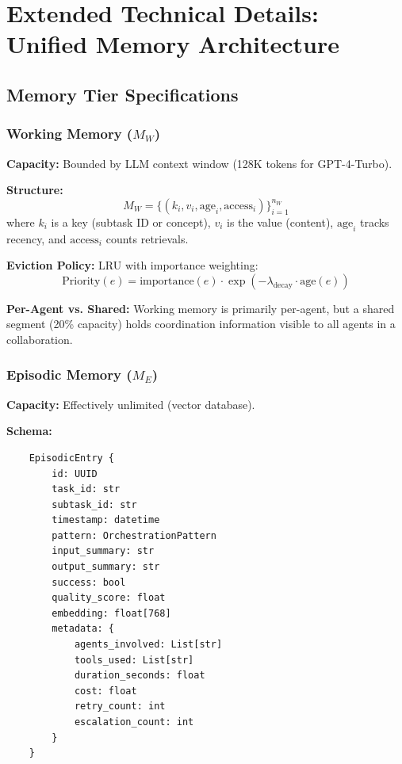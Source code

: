 \documentclass{article}
\theoremstyle{plain}
\theoremstyle{definition}
\theoremstyle{remark}
\begin{document}

\section{Extended Technical Details: Unified Memory Architecture}
\label{sec:uma_extended}

\subsection{Memory Tier Specifications}
\label{sec:uma_tiers}

\subsubsection{Working Memory ($M_W$)}

\textbf{Capacity:} Bounded by LLM context window (128K tokens for GPT-4-Turbo).

\textbf{Structure:}
\begin{equation}
	M_W = \{(k_i, v_i, \text{age}_i, \text{access}_i)\}_{i=1}^{n_W}
\end{equation}
where $k_i$ is a key (subtask ID or concept), $v_i$ is the value (content), $\text{age}_i$ tracks recency, and $\text{access}_i$ counts retrievals.

\textbf{Eviction Policy:} LRU with importance weighting:
\begin{equation}
	\text{Priority}(e) = \text{importance}(e) \cdot \exp(-\lambda_{\text{decay}} \cdot \text{age}(e))
\end{equation}

\textbf{Per-Agent vs. Shared:} Working memory is primarily per-agent, but a shared segment (20\% capacity) holds coordination information visible to all agents in a collaboration.

\subsubsection{Episodic Memory ($M_E$)}

\textbf{Capacity:} Effectively unlimited (vector database).

\textbf{Schema:}
\begin{verbatim}
	EpisodicEntry {
		id: UUID
		task_id: str
		subtask_id: str
		timestamp: datetime
		pattern: OrchestrationPattern
		input_summary: str
		output_summary: str
		success: bool
		quality_score: float
		embedding: float[768]
		metadata: {
			agents_involved: List[str]
			tools_used: List[str]
			duration_seconds: float
			cost: float
			retry_count: int
			escalation_count: int
		}
	}
\end{verbatim}
\end{document}
